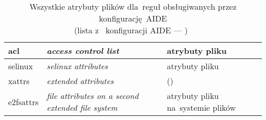 \documentclass[thesis]{subfiles}
\begin{document}
\begin{table}
\begin{tabular}{>{\ttfamily}l|>{\itshape}l|l}
		acl                        & access control list                    & atrybuty pliku \aclwiki                 \\\hline
		selinux                    & selinux attributes                     & atrybuty pliku \selinuxwiki             \\\hline
		xattrs                     & extended attributes                    & \xattrsman (\xattrswiki)                \\\hline
		e2fsattrs                  & file attributes on a second extended file system & atrybuty pliku na~systemie plików \extwiki
	\end{tabular}
	\caption[Wszystkie atrybuty plików dla~reguł obsługiwanych przez konfigurację~AIDE]{Wszystkie atrybuty plików dla~reguł obsługiwanych przez konfigurację~AIDE\\(lista z~\emph{} konfiguracji AIDE --- )~\cite{aide-manual}}
	\label{tab:aide-file-attrs}
\end{table}

%
%

%
%
\end{document}
